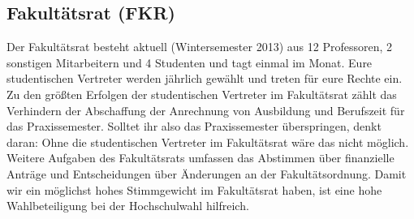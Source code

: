 \subsection{Fakultätsrat (FKR)}
Der Fakultätsrat besteht aktuell (Wintersemester 2013) aus 12 
Professoren, 2 sonstigen Mitarbeitern und 4 Studenten und tagt einmal 
im Monat. Eure studentischen Vertreter werden jährlich gewählt und 
treten für eure Rechte ein. 
Zu den größten Erfolgen der studentischen Vertreter im Fakultätsrat 
zählt das Verhindern der Abschaffung der Anrechnung von 
Ausbildung und Berufszeit für das Praxissemester. Solltet ihr also das 
Praxissemester überspringen, denkt daran: Ohne die studentischen 
Vertreter im Fakultätsrat wäre das nicht möglich. Weitere Aufgaben 
des Fakultätsrats umfassen das Abstimmen über finanzielle Anträge 
und Entscheidungen über Änderungen an der Fakultätsordnung. Damit 
wir ein möglichst hohes Stimmgewicht im Fakultätsrat haben, ist eine 
hohe Wahlbeteiligung bei der Hochschulwahl hilfreich. 